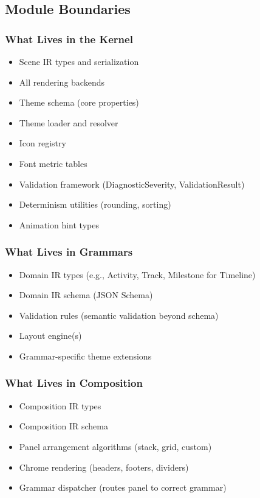 \subsection{Module Boundaries}

\subsubsection{What Lives in the Kernel}

\begin{itemize}
  \item Scene IR types and serialization
  \item All rendering backends
  \item Theme schema (core properties)
  \item Theme loader and resolver
  \item Icon registry
  \item Font metric tables
  \item Validation framework (DiagnosticSeverity, ValidationResult)
  \item Determinism utilities (rounding, sorting)
  \item Animation hint types
\end{itemize}

\subsubsection{What Lives in Grammars}

\begin{itemize}
  \item Domain IR types (e.g., Activity, Track, Milestone for Timeline)
  \item Domain IR schema (JSON Schema)
  \item Validation rules (semantic validation beyond schema)
  \item Layout engine(s)
  \item Grammar-specific theme extensions
\end{itemize}

\subsubsection{What Lives in Composition}

\begin{itemize}
  \item Composition IR types
  \item Composition IR schema
  \item Panel arrangement algorithms (stack, grid, custom)
  \item Chrome rendering (headers, footers, dividers)
  \item Grammar dispatcher (routes panel to correct grammar)
\end{itemize}

